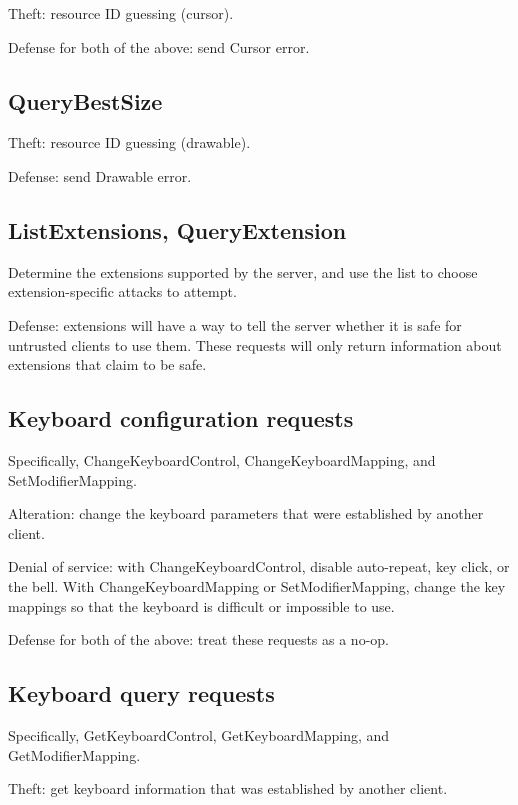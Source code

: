 \documentclass{article}
\begin{document}
Theft: resource ID guessing (cursor).

Defense for both of the above: send Cursor error.



\subsection{QueryBestSize}

Theft: resource ID guessing (drawable).

Defense: send Drawable error.



\subsection{ListExtensions, QueryExtension}

Determine the extensions supported by the server, and use the list to
choose extension-specific attacks to attempt.

Defense: extensions will have a way to tell the server whether it is
safe for untrusted clients to use them.  These requests will only
return information about extensions that claim to be safe.



\subsection{Keyboard configuration requests}

Specifically, ChangeKeyboardControl, ChangeKeyboardMapping,
and SetModifierMapping.

Alteration: change the keyboard parameters that were established by
another client.

Denial of service: with ChangeKeyboardControl, disable auto-repeat,
key click, or the bell.  With ChangeKeyboardMapping or
SetModifierMapping, change the key mappings so that the keyboard is
difficult or impossible to use.

Defense for both of the above: treat these requests as a no-op.



\subsection{Keyboard query requests}

Specifically, GetKeyboardControl, GetKeyboardMapping, and
GetModifierMapping.

Theft: get keyboard information that was established by another
client.
\end{document}
